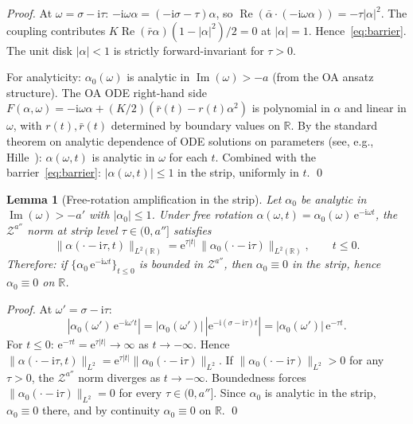 \documentclass[11pt,a4paper]{article}
\newtheorem{lemma}[theorem]{Lemma}
\theoremstyle{definition}
\DeclareMathOperator{\re}{Re}
\DeclareMathOperator{\im}{Im}
\newcommand{\R}{\mathbb{R}}
\begin{document}
\begin{proof}
At $\omega = \sigma - \mathrm{i}\tau$: $-\mathrm{i}\omega\alpha = (-\mathrm{i}\sigma - \tau)\alpha$, so $\re(\bar{\alpha}\cdot(-\mathrm{i}\omega\alpha)) = -\tau|\alpha|^2$. The coupling contributes $K\re(\bar{r}\alpha)(1-|\alpha|^2)/2 = 0$ at $|\alpha| = 1$. Hence~\eqref{eq:barrier}. The unit disk $|\alpha| < 1$ is strictly forward-invariant for $\tau > 0$.

For analyticity: $\alpha_0(\omega)$ is analytic in $\im(\omega) > -a$ (from the OA ansatz structure). The OA ODE right-hand side $F(\alpha, \omega) = -\mathrm{i}\omega\alpha + (K/2)(\bar{r}(t) - r(t)\alpha^2)$ is polynomial in $\alpha$ and linear in $\omega$, with $r(t), \bar{r}(t)$ determined by boundary values on $\R$. By the standard theorem on analytic dependence of ODE solutions on parameters (see, e.g., Hille~\cite{hille1997}): $\alpha(\omega,t)$ is analytic in $\omega$ for each $t$. Combined with the barrier~\eqref{eq:barrier}: $|\alpha(\omega,t)| \leq 1$ in the strip, uniformly in $t$. \qed
\end{proof}

\begin{lemma}[Free-rotation amplification in the strip]\label{lem:free-rot-amp}
Let $\alpha_0$ be analytic in $\im(\omega) > -a'$ with $|\alpha_0| \leq 1$. Under free rotation $\alpha(\omega,t) = \alpha_0(\omega)\,\mathrm{e}^{-\mathrm{i}\omega t}$, the $\mathcal{Z}^{a''}$ norm at strip level $\tau \in (0, a'']$ satisfies
\[
\|\alpha(\cdot - \mathrm{i}\tau, t)\|_{L^2(\R)} = \mathrm{e}^{\tau|t|}\,\|\alpha_0(\cdot - \mathrm{i}\tau)\|_{L^2(\R)}, \qquad t \leq 0.
\]
Therefore: if $\{\alpha_0\,\mathrm{e}^{-\mathrm{i}\omega t}\}_{t \leq 0}$ is bounded in $\mathcal{Z}^{a''}$, then $\alpha_0 \equiv 0$ in the strip, hence $\alpha_0 \equiv 0$ on $\R$.
\end{lemma}

\begin{proof}
At $\omega' = \sigma - \mathrm{i}\tau$:
\[
|\alpha_0(\omega')\,\mathrm{e}^{-\mathrm{i}\omega' t}| = |\alpha_0(\omega')|\,|\mathrm{e}^{-\mathrm{i}(\sigma - \mathrm{i}\tau)t}| = |\alpha_0(\omega')|\,\mathrm{e}^{-\tau t}.
\]
For $t \leq 0$: $\mathrm{e}^{-\tau t} = \mathrm{e}^{\tau|t|} \to \infty$ as $t \to -\infty$. Hence $\|\alpha(\cdot - \mathrm{i}\tau, t)\|_{L^2} = \mathrm{e}^{\tau|t|}\|\alpha_0(\cdot - \mathrm{i}\tau)\|_{L^2}$. If $\|\alpha_0(\cdot - \mathrm{i}\tau)\|_{L^2} > 0$ for any $\tau > 0$, the $\mathcal{Z}^{a''}$ norm diverges as $t \to -\infty$. Boundedness forces $\|\alpha_0(\cdot - \mathrm{i}\tau)\|_{L^2} = 0$ for every $\tau \in (0, a'']$. Since $\alpha_0$ is analytic in the strip, $\alpha_0 \equiv 0$ there, and by continuity $\alpha_0 \equiv 0$ on $\R$. \qed
\end{proof}
\end{document}
